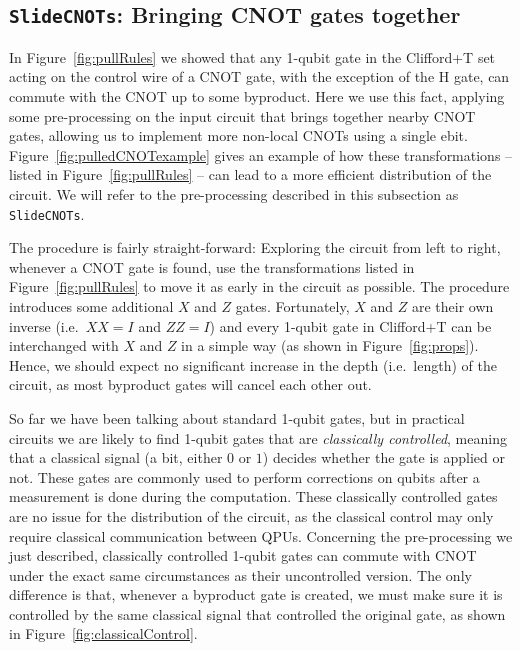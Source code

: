 
\subsection{\texttt{SlideCNOTs}: Bringing CNOT gates together}
\label{pullCNOTs}


In Figure~\ref{fig:pullRules} we showed that any 1-qubit gate in the Clifford+T set acting on the control wire of a CNOT gate, with the exception of the H gate, can commute with the CNOT up to some byproduct. Here we use this fact, applying some pre-processing on the input circuit that brings together nearby CNOT gates, allowing us to implement more non-local CNOTs using a single ebit. Figure~\ref{fig:pulledCNOTexample} gives an example of how these transformations -- listed in Figure~\ref{fig:pullRules} -- can lead to a more efficient distribution of the circuit. We will refer to the pre-processing described in this subsection as \texttt{SlideCNOTs}.



The procedure is fairly straight-forward: Exploring the circuit from left to right, whenever a CNOT gate is found, use the transformations listed in Figure~\ref{fig:pullRules} to move it as early in the circuit as possible. The procedure introduces some additional \(X\) and \(Z\) gates. Fortunately, \(X\) and \(Z\) are their own inverse (i.e.\ \(XX = I\) and \(ZZ = I\)) and every 1-qubit gate in Clifford+T can be interchanged with \(X\) and \(Z\) in a simple way (as shown in Figure~\ref{fig:props}). Hence, we should expect no significant increase in the depth (i.e.\ length) of the circuit, as most byproduct gates will cancel each other out.

So far we have been talking about standard 1-qubit gates, but in practical circuits we are likely to find 1-qubit gates that are \textit{classically controlled}, meaning that a classical signal (a bit, either \(0\) or \(1\)) decides whether the gate is applied or not. These gates are commonly used to perform corrections on qubits after a measurement is done during the computation. These classically controlled gates are no issue for the distribution of the circuit, as the classical control may only require classical communication between QPUs. Concerning the pre-processing we just described, classically controlled 1-qubit gates can commute with CNOT under the exact same circumstances as their uncontrolled version. The only difference is that, whenever a byproduct gate is created, we must make sure it is controlled by the same classical signal that controlled the original gate, as shown in Figure~\ref{fig:classicalControl}.

